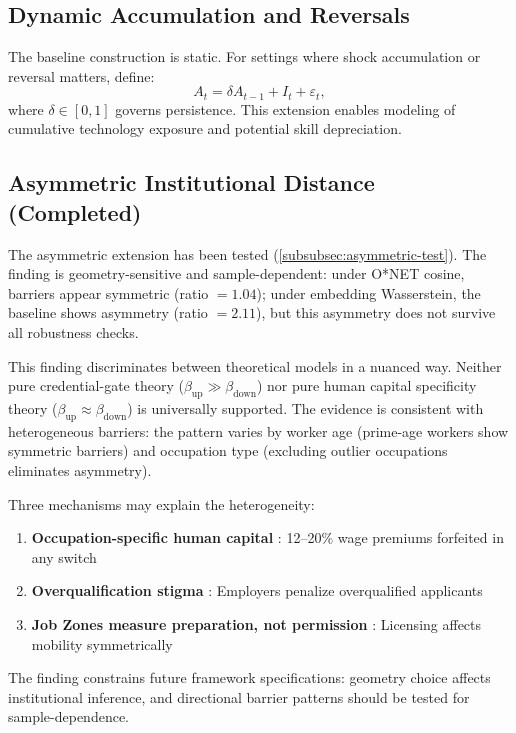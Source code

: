 \documentclass[12pt]{article}
\begin{document}
\subsection{Dynamic Accumulation and Reversals}
\label{subsec:dynamic}


The baseline construction is static. For settings where shock accumulation or reversal matters, define:
\[
A_t = \delta A_{t-1} + I_t + \varepsilon_t,
\]
where $\delta \in [0,1]$ governs persistence. This extension enables modeling of cumulative technology exposure and potential skill depreciation.


\subsection{Asymmetric Institutional Distance (Completed)}
\label{subsec:asymmetric}


The asymmetric extension has been tested (\cref{subsubsec:asymmetric-test}). The finding is geometry-sensitive and sample-dependent: under O*NET cosine, barriers appear symmetric (ratio $= 1.04$); under embedding Wasserstein, the baseline shows asymmetry (ratio $= 2.11$), but this asymmetry does not survive all robustness checks.

This finding discriminates between theoretical models in a nuanced way. Neither pure credential-gate theory ($\beta_{\mathrm{up}} \gg \beta_{\mathrm{down}}$) nor pure human capital specificity theory ($\beta_{\mathrm{up}} \approx \beta_{\mathrm{down}}$) is universally supported. The evidence is consistent with heterogeneous barriers: the pattern varies by worker age (prime-age workers show symmetric barriers) and occupation type (excluding outlier occupations eliminates asymmetry).

Three mechanisms may explain the heterogeneity:
\begin{enumerate}
    \item \textbf{Occupation-specific human capital} \citep{KambourovManovskii2009}: 12--20\% wage premiums forfeited in any switch
    \item \textbf{Overqualification stigma} \citep{Pedulla2016}: Employers penalize overqualified applicants
    \item \textbf{Job Zones measure preparation, not permission} \citep{KleinerXu2020}: Licensing affects mobility symmetrically
\end{enumerate}

The finding constrains future framework specifications: geometry choice affects institutional inference, and directional barrier patterns should be tested for sample-dependence.
\end{document}
